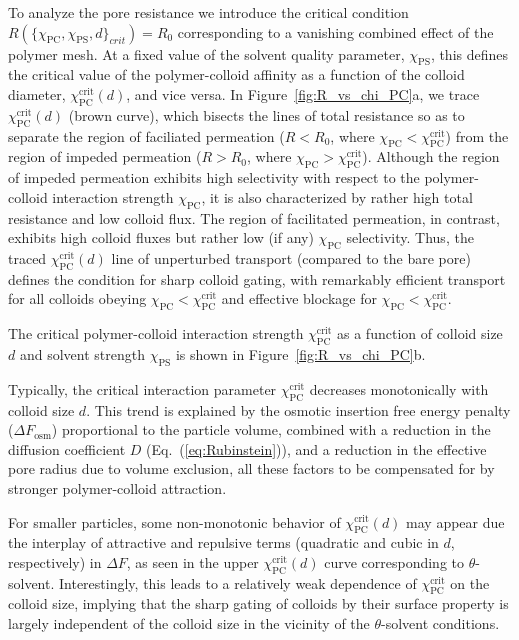 \documentclass[12pt, a4paper]{article}
\begin{document}
To analyze the pore resistance we introduce the critical condition
\\$R(\{\chi_{\text{PC}}, \chi_{\text{PS}}, d\}_{crit}) = R_{0}$ corresponding to a vanishing combined effect of the polymer mesh. At a fixed value of the solvent quality parameter, $\chi_{\text{PS}}$, this defines the critical value of the polymer-colloid affinity as a function of the colloid diameter, $\chi_{\text{PC}}^{\text{crit}}(d)$, and vice versa.
In Figure~\ref{fig:R_vs_chi_PC}a, we trace $\chi_{\text{PC}}^{\text{crit}}(d)$ (brown curve), which bisects the lines of total resistance so as to separate the region of faciliated permeation ($R < R_{0}$, where $\chi_{\text{PC}} < \chi_{\text{PC}}^{\text{crit}}$) from the region of impeded permeation ($R > R_{0}$, where $\chi_{\text{PC}} > \chi_{\text{PC}}^{\text{crit}}$).
Although the region of impeded permeation exhibits high selectivity with respect to the polymer-colloid interaction strength $\chi_{\text{PC}}$, it is also characterized by rather high total resistance and low colloid flux.
The region of facilitated permeation, in contrast, exhibits high colloid fluxes but rather low (if any) $\chi_{\text{PC}}$ selectivity. 
Thus, the traced $\chi_{\text{PC}}^{\text{crit}}(d)$ line of unperturbed transport (compared to the bare pore) defines the condition for sharp colloid gating, with remarkably efficient transport for all colloids obeying $\chi_{\text{PC}} < \chi_{\text{PC}}^{\text{crit}}$ and effective blockage for $\chi_{\text{PC}} < \chi_{\text{PC}}^{\text{crit}}$.

The critical polymer-colloid interaction strength $\chi_{\text{PC}}^{\text{crit}}$ as a function of colloid size $d$ and solvent strength $\chi_{\text{PS}}$ is shown in Figure~\ref{fig:R_vs_chi_PC}b.

Typically, the critical interaction parameter $\chi_{\text{PC}}^{\text{crit}}$ decreases monotonically with colloid size $d$. 
This trend is explained by the osmotic insertion free energy penalty ($\Delta F_{\text{osm}}$) proportional to the particle volume, combined with a reduction in the diffusion coefficient $D$ (Eq.~(\ref{eq:Rubinstein})), and a reduction in the effective pore radius due to volume exclusion, all these factors to be compensated for by stronger polymer-colloid attraction. 

For smaller particles, some non-monotonic behavior of $\chi_{\text{PC}}^{\text{crit}}(d)$ may appear due the interplay of attractive and repulsive terms (quadratic and cubic in $d$, respectively) in $\Delta F$, as seen in the upper $\chi_{\text{PC}}^{\text{crit}}(d)$  curve corresponding to $\theta$-solvent. Interestingly, this leads to a relatively weak dependence of $\chi_{\text{PC}}^{\text{crit}}$ on the colloid size, implying that the sharp gating of colloids by their surface property is largely independent of the colloid size in the vicinity of the $\theta$-solvent conditions.
\end{document}
